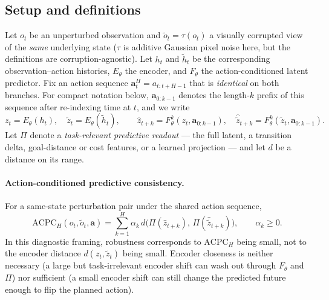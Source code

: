 \documentclass[10pt]{article}
\begin{document}
\subsection{Setup and definitions}\label{sec:acpc-def}

Let $o_t$ be an unperturbed observation and $\tilde o_t = \tau(o_t)$ a visually corrupted view of the \emph{same} underlying state ($\tau$ is additive Gaussian pixel noise here, but the definitions are corruption-agnostic). Let $h_t$ and $\tilde h_t$ be the corresponding observation--action histories, $E_\theta$ the encoder, and $F_\theta$ the action-conditioned latent predictor. Fix an action sequence $\mathbf a^H_t = a_{t:t+H-1}$ that is \emph{identical} on both branches. For compact notation below, $\mathbf a_{0:k-1}$ denotes the length-$k$ prefix of this sequence after re-indexing time at $t$, and we write
\begin{equation}
  z_t = E_\theta(h_t), \quad \tilde z_t = E_\theta(\tilde h_t), \qquad
  \hat z_{t+k} = F_\theta^{k}(z_t, \mathbf a_{0:k-1}), \quad
  \hat{\tilde z}_{t+k} = F_\theta^{k}(\tilde z_t, \mathbf a_{0:k-1}).
  \label{eq:acpc-objects}
\end{equation}
Let $\Pi$ denote a \emph{task-relevant predictive readout} --- the full latent, a transition delta, goal-distance or cost features, or a learned projection --- and let $d$ be a distance on its range.

\paragraph{Action-conditioned predictive consistency.} For a same-state perturbation pair under the shared action sequence,
\begin{equation}
  \mathrm{ACPC}_H(o_t, \tilde o_t, \mathbf a)
  = \sum_{k=1}^{H} \alpha_k \, d\!\big(\Pi(\hat z_{t+k}),\, \Pi(\hat{\tilde z}_{t+k})\big),
  \qquad \alpha_k \ge 0 .
  \label{eq:acpc-h}
\end{equation}
In this diagnostic framing, robustness corresponds to $\mathrm{ACPC}_H$ being small, not to the encoder distance $d(z_t, \tilde z_t)$ being small. Encoder closeness is neither necessary (a large but task-irrelevant encoder shift can wash out through $F_\theta$ and $\Pi$) nor sufficient (a small encoder shift can still change the predicted future enough to flip the planned action).
\end{document}
